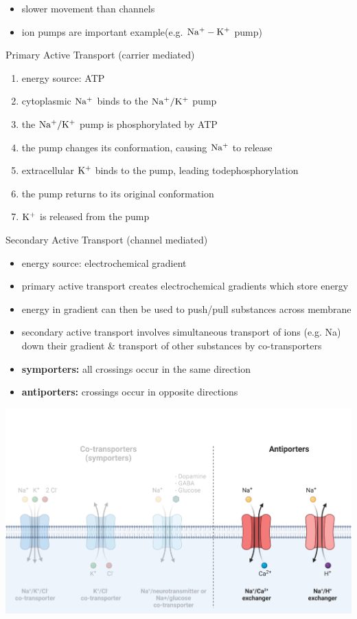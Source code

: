 \documentclass[11pt,fleqn]{book}
\begin{document}
\begin{descriptions}
\begin{enumerate}
\begin{itemize}
            \item slower movement than channels
            \item ion pumps are important example(e.g. ${\rm Na^+-K^+}$ pump)
        \end{itemize}
    \end{enumerate}
    \item[Primary Active Transport (carrier mediated)]\begin{descriptions}
    \end{descriptions}
    \begin{enumerate}
        \item energy source: ATP
        \item cytoplasmic ${\rm Na^+}$ binds to the ${\rm Na^+/K^+}$ pump
        \item the ${\rm Na^+/K^+}$ pump is phosphorylated by ATP
        \item the pump changes its conformation, causing ${\rm Na^+}$ to release
        \item extracellular ${\rm K^+}$ binds to the pump, leading todephosphorylation
        \item the pump returns to its original conformation
        \item ${\rm K^+}$ is released from the pump
    \end{enumerate}
    \item[Secondary Active Transport (channel mediated)]\begin{descriptions}
    \end{descriptions}
    \begin{itemize}
        \item energy source: electrochemical gradient
        \item primary active transport creates electrochemical gradients which store energy
        \item energy in gradient can then be used to push/pull substances across membrane
        \item secondary active transport involves simultaneous transport of ions (e.g. Na) down their gradient \& transport of other substances by co-transporters
        \item \textbf{symporters:} all crossings occur in the same direction
        \item \textbf{antiporters:} crossings occur in opposite directions
    \end{itemize}
\begin{center}
    \includegraphics[width=0.65\linewidth]{Pictures/Screenshot 2024-02-25 211519.png}

\end{center}
\end{descriptions}
\end{document}
